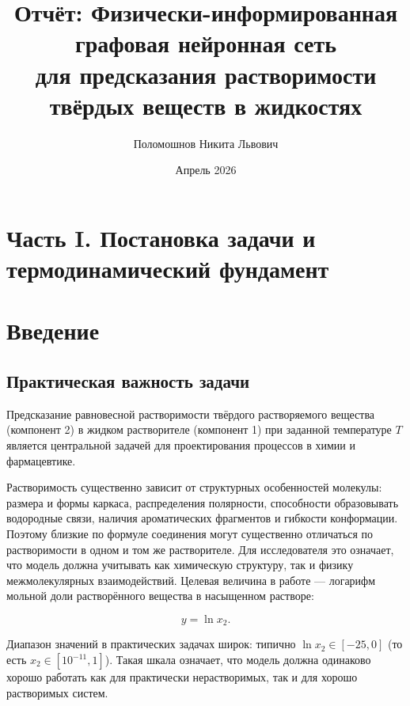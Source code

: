 \documentclass[11pt]{article}
\begin{document}
\title{Отчёт: Физически-информированная графовая нейронная сеть\\
для предсказания растворимости твёрдых веществ в жидкостях}
\author{Поломошнов Никита Львович}
\date{Апрель 2026}
\maketitle

\tableofcontents
\newpage

\section*{Часть I. Постановка задачи и термодинамический фундамент}

\section{Введение}

\subsection{Практическая важность задачи}

Предсказание равновесной растворимости твёрдого растворяемого вещества (компонент 2) в жидком растворителе (компонент 1) при заданной температуре $T$ является центральной задачей для проектирования процессов в химии и фармацевтике.

Растворимость существенно зависит от структурных особенностей молекулы: размера и формы каркаса, распределения полярности, способности образовывать водородные связи, наличия ароматических фрагментов и гибкости конформации. Поэтому близкие по формуле соединения могут существенно отличаться по растворимости в одном и том же растворителе. Для исследователя это означает, что модель должна учитывать как химическую структуру, так и физику межмолекулярных взаимодействий. Целевая величина в работе --- логарифм мольной доли растворённого вещества в насыщенном растворе:

\begin{equation*}
y = \ln x_2.
\end{equation*}

Диапазон значений в практических задачах широк: типично $\ln x_2 \in [-25, 0]$ (то есть $x_2 \in [10^{-11}, 1]$). Такая шкала означает, что модель должна одинаково хорошо работать как для практически нерастворимых, так и для хорошо растворимых систем.
\end{document}
